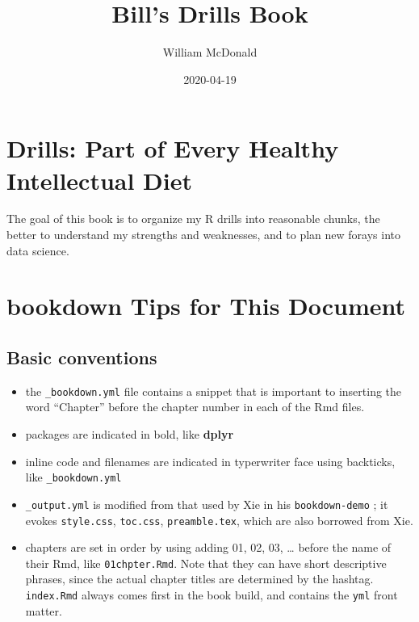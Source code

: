 \documentclass[]{book}
\title{Bill's Drills Book}
\author{William McDonald}
\date{2020-04-19}
\providecommand{\tightlist}{%
  \setlength{\itemsep}{0pt}\setlength{\parskip}{0pt}}
\begin{document}
\maketitle

{
\setcounter{tocdepth}{1}
\tableofcontents
}
\hypertarget{intro}{%
\chapter{Drills: Part of Every Healthy Intellectual Diet}\label{intro}}

The goal of this book is to organize my R drills into reasonable chunks, the better to understand my strengths and weaknesses, and to plan new forays into data science.

\hypertarget{bookdownplan}{%
\chapter{bookdown Tips for This Document}\label{bookdownplan}}

\hypertarget{basic-conventions}{%
\section{Basic conventions}\label{basic-conventions}}

\begin{itemize}
\tightlist
\item
  the \texttt{\_bookdown.yml} file contains a snippet that is important to inserting the word ``Chapter'' before the chapter number in each of the Rmd files.
\item
  packages are indicated in bold, like \textbf{dplyr}
\item
  inline code and filenames are indicated in typerwriter face using backticks, like \texttt{\_bookdown.yml}
\item
  \texttt{\_output.yml} is modified from that used by Xie in his \texttt{bookdown-demo} \citep{R-bookdown}; it evokes \texttt{style.css}, \texttt{toc.css}, \texttt{preamble.tex}, which are also borrowed from Xie.
\item
  chapters are set in order by using adding 01, 02, 03, \ldots{} before the name of their Rmd, like \texttt{01chpter.Rmd}. Note that they can have short descriptive phrases, since the actual chapter titles are determined by the hashtag. \texttt{index.Rmd} always comes first in the book build, and contains the \texttt{yml} front matter.
\end{itemize}
\end{document}
